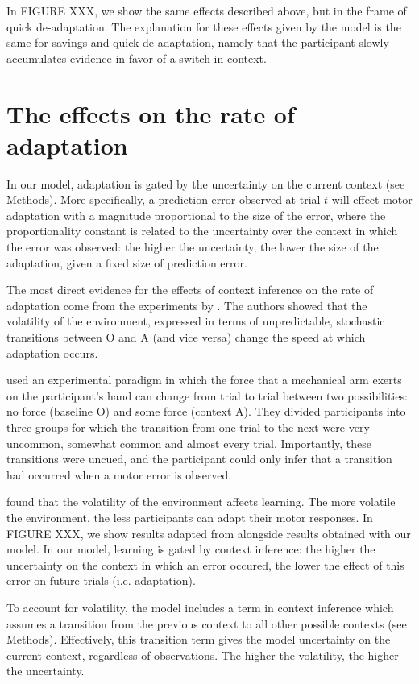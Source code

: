 \documentclass[a4paper,doc,floatsintext,natbib]{apa6}
\begin{document}
In FIGURE XXX, we show the same effects described above, but in the frame of quick de-adaptation. The explanation for these effects given by the model is the same for savings and quick de-adaptation, namely that the participant slowly accumulates evidence in favor of a switch in context.


\section{The effects on the rate of adaptation}
In our model, adaptation is gated by the uncertainty on the current context (see Methods). More specifically, a prediction error observed at trial $t$ will effect motor adaptation with a magnitude proportional to the size of the error, where the proportionality constant is related to the uncertainty over the context in which the error was observed: the higher the uncertainty, the lower the size of the adaptation, given a fixed size of prediction error.

The most direct evidence for the effects of context inference on the rate of adaptation come from the experiments by \cite{Herzfeld_memory_2014}. The authors showed that the volatility of the environment, expressed in terms of unpredictable, stochastic transitions between O and A (and vice versa) change the speed at which adaptation occurs.

\cite{Herzfeld_memory_2014} used an experimental paradigm in which the force that a mechanical arm exerts on the participant's hand can change from trial to trial between two possibilities: no force (baseline O) and some force (context A). They divided participants into three groups for which the transition from one trial to the next were very uncommon, somewhat common and almost every trial. Importantly, these transitions were uncued, and the participant could only infer that a transition had occurred when a motor error is observed.

\cite{Herzfeld_memory_2014} found that the volatility of the environment affects learning. The more volatile the environment, the less participants can adapt their motor responses. In FIGURE XXX, we show results adapted from \cite{Herzfeld_memory_2014} alongside results obtained with our model. In our model, learning is gated by context inference: the higher the uncertainty on the context in which an error occured, the lower the effect of this error on future trials (i.e. adaptation).

To account for volatility, the model includes a term in context inference which assumes a transition from the previous context to all other possible contexts (see Methods). Effectively, this transition term gives the model uncertainty on the current context, regardless of observations. The higher the volatility, the higher the uncertainty.
\end{document}
